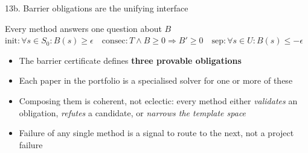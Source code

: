 \documentclass[aspectratio=169]{beamer}
\begin{document}
\begin{frame}{13b. Barrier obligations are the unifying interface}
\begin{block}{Every method answers one question about \(B\)}
\(\text{init}: \forall s\in S_0: B(s)\ge\epsilon\quad
\text{consec}: T\land B\ge0\Rightarrow B'\ge0\quad
\text{sep}: \forall s\in U: B(s)\le-\epsilon\)
\end{block}
\begin{itemize}
  \item The barrier certificate defines \textbf{three provable obligations}
  \item Each paper in the portfolio is a specialised solver for one or more of these
  \item Composing them is coherent, not eclectic: every method either \emph{validates} an obligation, \emph{refutes} a candidate, or \emph{narrows the template space}
  \item Failure of any single method is a signal to route to the next, not a project failure
\end{itemize}
\end{frame}
\end{document}
